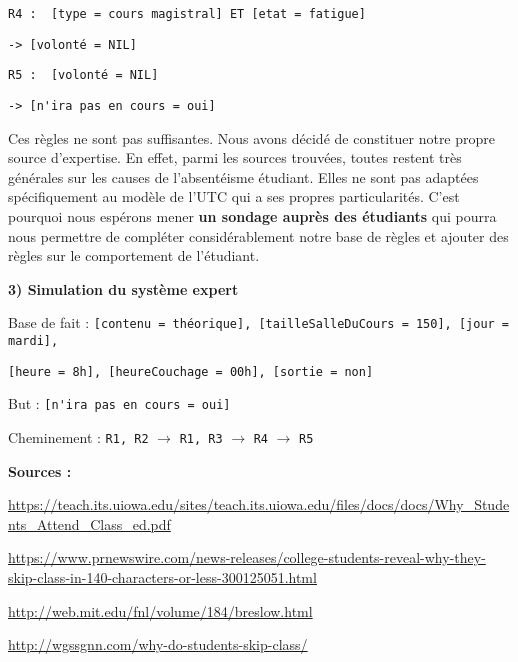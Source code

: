 \documentclass[a4paper]{article}
\begin{document}
\verb+R4 :	[type = cours magistral] ET [etat = fatigue]+
	
\hspace{4ex}\verb+-> [volonté = NIL]+

\verb+R5 :	[volonté = NIL]+
	
\hspace{4ex}\verb+-> [n'ira pas en cours = oui]+

Ces règles ne sont pas suffisantes. Nous avons décidé de constituer notre propre source d'expertise. En effet, parmi les sources trouvées, toutes restent très générales sur les causes de l'absentéisme étudiant. Elles ne sont pas adaptées spécifiquement au modèle de l'UTC qui a ses propres particularités. C'est pourquoi nous espérons mener {\bfseries un sondage auprès des étudiants} qui pourra nous permettre de compléter considérablement notre base de règles et ajouter des règles sur le comportement de l'étudiant.

\medskip

{\large{\bfseries 3) Simulation du système expert}}

\smallskip

Base de fait : \verb+[contenu = théorique], [tailleSalleDuCours = 150], [jour = mardi],+ 

\verb+[heure = 8h], [heureCouchage = 00h], [sortie = non]+

But : \verb+[n'ira pas en cours = oui]+

Cheminement : \verb+R1, R2+ $\to$ \verb+R1, R3+ $\to$ \verb+R4+ $\to$ \verb+R5+

\newpage

{\bfseries Sources :}

\url{https://teach.its.uiowa.edu/sites/teach.its.uiowa.edu/files/docs/docs/Why_Students_Attend_Class_ed.pdf}

\url{https://www.prnewswire.com/news-releases/college-students-reveal-why-they-skip-class-in-140-characters-or-less-300125051.html}

\url{http://web.mit.edu/fnl/volume/184/breslow.html}

\url{http://wgssgnn.com/why-do-students-skip-class/}
\end{document}
